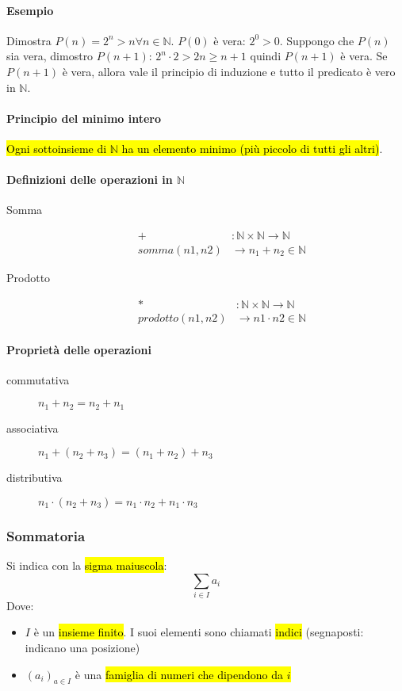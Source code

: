\documentclass[a4paper,11pt,oneside,dvipsnames]{article}
\begin{document}
\paragraph{Esempio} Dimostra $P(n) = 2^n > n \forall n \in \mathbb{N}$. $P(0)$ è vera: 
$2^0 > 0$. Suppongo che $P(n)$ sia vera, dimostro $P(n+1)$: $2^n \cdot 2 > 2n \geq n+1$
quindi $P(n+1)$ è vera. Se $P(n+1)$ è vera, allora vale il principio di induzione
e tutto il predicato è vero in $\mathbb{N}$.

\paragraph{Principio del minimo intero} \hl{Ogni sottoinsieme di 
$\mathbb{N}$ ha un elemento minimo (più piccolo di tutti gli altri)}.

\paragraph{Definizioni delle operazioni in $\mathbb{N}$}
\begin{description}
    \item[Somma] 
        \begin{align*}
            + &: \mathbb{N} \times \mathbb{N} \to \mathbb{N} \\
            somma(n1, n2) &\to n_1 + n_2 \in \mathbb{N}
        \end{align*}
    \item[Prodotto] 
        \begin{align*}
            * &: \mathbb{N} \times \mathbb{N} \to \mathbb{N} \\
            prodotto(n1, n2) &\to n1 \cdot n2 \in \mathbb{N}
        \end{align*}
\end{description}

\paragraph{Proprietà delle operazioni}
\begin{description}
    \item[commutativa] $n_1 + n_2 = n_2 + n_1$
    \item[associativa] $n_1 + (n_2 + n_3) = (n_1 + n_2) + n_3$
    \item[distributiva] $n_1 \cdot (n_2 + n_3) = n_1 \cdot n_2 + n_1 \cdot n_3$
\end{description}

\subsubsection{Sommatoria}
Si indica con la \hl{sigma maiuscola}:
\[
    \sum_{i \in I} a_i
\]
Dove:
\begin{itemize}
    \item $I$ è un \hl{insieme finito}. I suoi elementi sono chiamati 
        \hl{indici} (segnaposti: indicano una posizione)
    \item $(a_i)_{a \in I}$ è una \hl{famiglia di numeri che dipendono da $i$}
\end{itemize}
\end{document}
